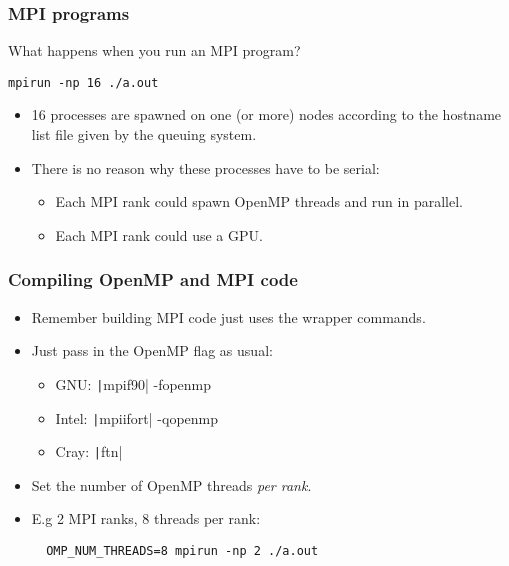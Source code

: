 \documentclass{beamer}
\begin{document}
\begin{frame}[fragile]
\frametitle{MPI programs}
What happens when you run an MPI program?
\begin{verbatim}
mpirun -np 16 ./a.out
\end{verbatim}

\begin{itemize}
  \item 16 processes are spawned on one (or more) nodes according to the hostname list file given by the queuing system.
  \item There is no reason why these processes have to be serial:
  \begin{itemize}
    \item Each MPI rank could spawn OpenMP threads and run in parallel.
    \item Each MPI rank could use a GPU.
  \end{itemize}
\end{itemize}

\end{frame}

\begin{frame}[fragile]
\frametitle{Compiling OpenMP and MPI code}
\begin{itemize}
  \item Remember building MPI code just uses the wrapper commands.
  \item Just pass in the OpenMP flag as usual:
    \begin{itemize}
      \item GNU: \texttt|mpif90| -fopenmp
      \item Intel: \texttt|mpiifort| -qopenmp
      \item Cray: \texttt|ftn|
    \end{itemize}
  \item Set the number of OpenMP threads \emph{per rank}.
  \item E.g 2 MPI ranks, 8 threads per rank:
  \begin{verbatim}
  OMP_NUM_THREADS=8 mpirun -np 2 ./a.out
  \end{verbatim}
\end{itemize}
\end{frame}
\end{document}
